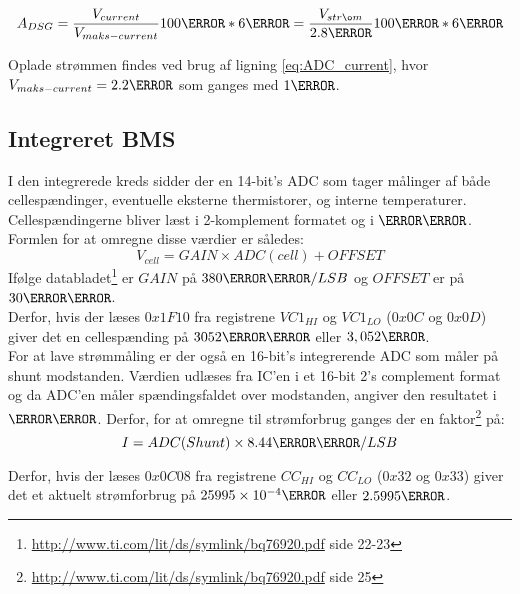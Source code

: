 \begin {equation}
A_{DSG} =  \frac{V_{current}}{V_{maks-current}} 100\percent * 6\ampere =  \frac{V_{strøm}}{2.8\volt} 100\percent * 6\ampere \label{eq:ADC_current}
\end {equation}

Oplade strømmen findes ved brug af ligning \ref{eq:ADC_current}, hvor $V_{maks-current} = 2.2\volt$ som ganges med $1\ampere$.


\subsection{Integreret BMS}
I den integrerede kreds sidder der en 14-bit's ADC som tager målinger af både cellespændinger, eventuelle eksterne thermistorer, og interne temperaturer. Cellespændingerne bliver læst i 2-komplement formatet og i $\milli\volt$. Formlen for at omregne disse værdier er således: 
\begin {equation} 
V_{cell} = GAIN \times ADC(cell) + OFFSET
\end {equation}
Ifølge databladet\footnote{\url{http://www.ti.com/lit/ds/symlink/bq76920.pdf} side 22-23} er $GAIN$ på $380\micro\volt/LSB$ og $OFFSET$ er på $30\milli\volt$. \\

Derfor, hvis der læses $0x1F10$ fra registrene $VC1_{HI}$ og $VC1_{LO}$ ($0x0C$ og $0x0D$) giver det en cellespænding på $3052\milli\volt$ eller $3,052\volt$.\\

For at lave strømmåling er der også en 16-bit's integrerende ADC som måler på shunt modstanden. Værdien udlæses fra IC'en i et 16-bit 2's complement format og da ADC'en måler spændingsfaldet over modstanden, angiver den resultatet i $\micro\volt$. Derfor, for at omregne til strømforbrug ganges der en faktor\footnote{\url{http://www.ti.com/lit/ds/symlink/bq76920.pdf} side 25} på: 
\begin {equation} 
I = ADC(Shunt) \times 8.44\micro\volt/LSB
\end {equation}

Derfor, hvis der læses $0x0C08$ fra registrene $CC_{HI}$ og $CC_{LO}$ ($0x32$ og $0x33$) giver det et aktuelt strømforbrug på $25995\times10^{-4}\ampere$ eller $2.5995\ampere$.